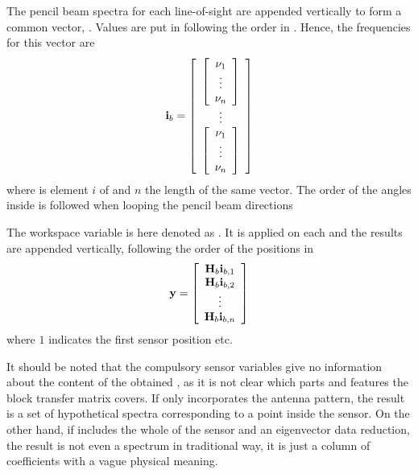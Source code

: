 The pencil beam spectra for each line-of-sight are appended vertically to form
a common vector, . Values are put in following the order in
. Hence, the frequencies for this vector are
\begin{equation}
  \mathbf{i}_{b} = 
  \left[ \begin{array}{c} 
     \left[
          \begin{array}{c} \nu_{1}\\\vdots\\\nu_{n} \end{array} 
     \right] \\
     \vdots \\
     \left[
          \begin{array}{c} \nu_{1}\\\vdots\\\nu_{n} \end{array} 
     \right]
     \end{array} \right]
  \label{eq:fm_defs:freqs_of_ib}
\end{equation}
where  is element $i$ of  and $n$ the length of the
same vector. The order of the angles inside  is
followed when looping the pencil beam directions

The workspace variable  is here denoted as
. It is applied on each  and the results are
appended vertically, following the order of the positions in
\begin{equation}
  \mathbf{y} = \left[ \begin{array}{c} \mathbf{H}_{b}\mathbf{i}_{{b,1}} \\ 
                                    \mathbf{H}_{b}\mathbf{i}_{{b,2}} \\
                                    \vdots                     \\
                                    \mathbf{H}_{b}\mathbf{i}_{{b,n}} 
            \end{array} \right]
  \label{eq:fm_defs:measseq}
\end{equation}
where $1$ indicates the first sensor position etc. 

It should be noted that the compulsory sensor variables give no
information about the content of the obtained \MsrVct, as it is not
clear which parts and features the block transfer matrix covers. If
 only incorporates the antenna pattern, the result is a set
of hypothetical spectra corresponding to a point inside the sensor. On
the other hand, if  includes the whole of the sensor and an
eigenvector data reduction, the result is not even a spectrum in
traditional way, it is just a column of coefficients with a vague
physical meaning.


